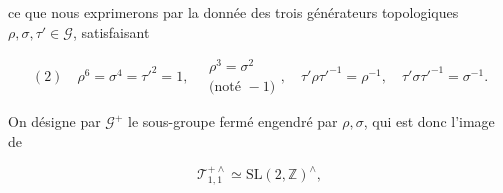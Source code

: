 ce que nous exprimerons par la donnée des trois générateurs topologiques
$\rho,\sigma,\tau'\in\mathcal G$, satisfaisant

\[
(2)\quad \rho^6=\sigma^4=\tau'^2=1,\quad
\begin{gathered}\rho^3=\sigma^2\\\text{(noté }-1\text{)}\end{gathered},\quad
\tau'\rho\tau'^{-1}=\rho^{-1},\quad
\tau'\sigma\tau'^{-1}=\sigma^{-1}.
\]

On désigne par $\mathcal G^+$ le sous-groupe fermé engendré par $\rho,\sigma$,
qui est donc l'image de

\[
\mathcal T_{1,1}^{+\wedge}\simeq\mathrm{SL}(2,\mathbb Z)^{\wedge},
\]


